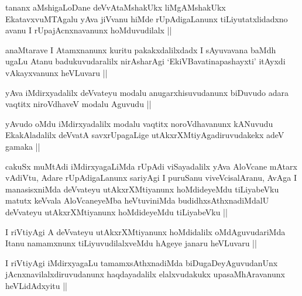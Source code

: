 \begin{artha}
tananx aMshigaLoDane deVvAtaMshakUkx liMgAMshakUkx EkatavxvuMTAgalu
yAva jiVvanu hiMde rUpAdigaLanunx tiLiyutatxlidadxno avanu I
rUpajAcnxnavanunx hoMduvudilalx ||
\end{artha}


\begin{artha}
anaMtarave I Atamxnanunx kuritu pakakxdalilxdadx I sAyuvavana
baMdh ugaLu Atanu badukuvudaralilx nirAsharAgi `EkiVBavatinapashayxti'
itAyxdi vAkayxvanunx heVLuvaru ||
\end{artha}


\begin{artha}
yAva iMdirxyadalilx deVvateyu modalu anugarxhisuvudanunx biDuvudo
adara vaqtitx niroVdhaveV modalu Aguvudu ||
\end{artha}


\begin{artha}
yAvudo oMdu iMdirxyadalilx modalu vaqtitx noroVdhavanunx kANuvudu
EkakAladalilx deVvatA savxrUpagaLige utAkxrXMtiyAgadiruvudakekx adeV
gamaka ||
\end{artha}

\begin{artha}
cakuSx muMtAdi iMdirxyagaLiMda rUpAdi viSayadalilx yAva AloVcane
mAtarx vAdiVtu, Adare rUpAdigaLanunx sariyAgi I puruSanu
viveVcisalAranu, AvAga I manasisxniMda deVvateyu utAkxrXMtiyanunx
hoMdideyeMdu tiLiyabeVku matutx keVvala AloVcaneyeMba heVtuviniMda
budidhxsAthxnadiMdalU deVvateyu utAkxrXMtiyanunx hoMdideyeMdu
tiLiyabeVku ||
\end{artha}

\begin{artha}
I riVtiyAgi A deVvateyu utAkxrXMtiyanunx hoMdidalilx oMdAguvudariMda
Itanu namamxnunx tiLiyuvudilalxveMdu hAgeye janaru heVLuvaru ||
\end{artha}

\begin{artha}
I riVtiyAgi iMdirxyagaLu tamamxsAthxnadiMda biDugaDeyAguvudanUnx
jAcnxnavilalxdiruvudanunx haqdayadalilx elalxvudakukx upasaMhAravanunx
heVLidAdxyitu ||
\end{artha}

